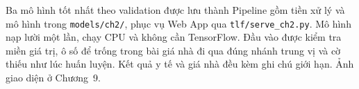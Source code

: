 Ba mô hình tốt nhất theo validation được lưu thành Pipeline gồm tiền xử lý và mô hình trong \texttt{models/ch2/}, phục vụ Web App qua \texttt{tlf/serve\_ch2.py}. Mô hình nạp lười một lần, chạy CPU và không cần TensorFlow. Đầu vào được kiểm tra miền giá trị, ô số để trống trong bài giá nhà đi qua đúng nhánh trung vị và cờ thiếu như lúc huấn luyện. Kết quả y tế và giá nhà đều kèm ghi chú giới hạn. Ảnh giao diện ở Chương~9.

